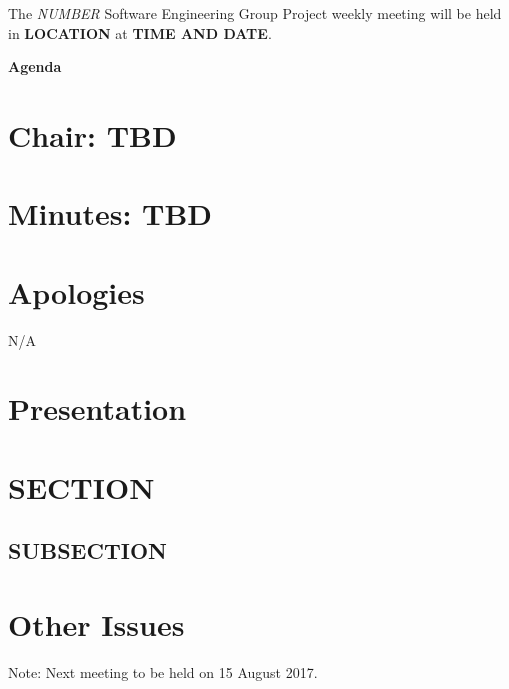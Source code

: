 \documentclass[11pt, a4paper]{article}
\newcommand{\meetingno}{ NUMBER }
\newcommand{\meetinglocation}{ LOCATION } %
\newcommand{\meetingdatetime}{ TIME AND DATE} %
\newcommand{\meetingchair}{ TBD } %
\newcommand{\meetingminutes}{ TBD }
\begin{document}
  \noindent The {\em \meetingno} Software Engineering Group Project weekly meeting will be held in {\bf \meetinglocation } at {\bf \meetingdatetime }.

  \vspace*{15pt}

  \begin{center}
  \huge \bf Agenda
  \end{center}

  \section*{Chair: \meetingchair }
  \section*{Minutes: \meetingminutes }
  

  \vspace*{10pt}

  \section{Apologies}
  N/A %

  \section{Presentation}


  \section{ SECTION }

  \subsection{ SUBSECTION }

  \section{Other Issues}

  \vspace*{10pt}
  \noindent Note: Next meeting to be held on 15 August 2017.


  
\end{document}

